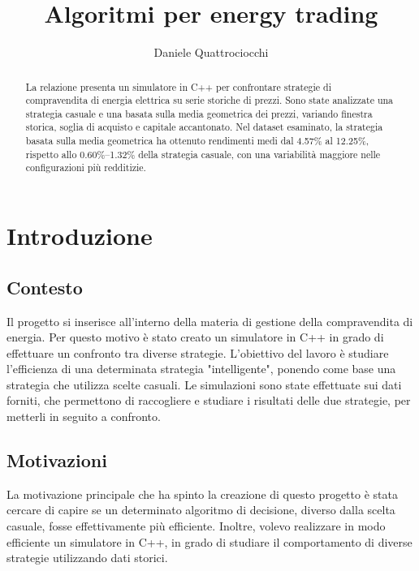 \documentclass[a4paper,oneside,italian]{sapthesis}
\title{Algoritmi per energy trading}
\author{Daniele Quattrociocchi}
\begin{document}
\frontmatter
\maketitle

\begin{abstract}
La relazione presenta un simulatore in C++ per confrontare strategie di compravendita
di energia elettrica su serie storiche di prezzi. Sono state analizzate una strategia
casuale e una basata sulla media geometrica dei prezzi, variando finestra storica,
soglia di acquisto e capitale accantonato. Nel dataset esaminato, la strategia basata
sulla media geometrica ha ottenuto rendimenti medi dal 4.57\% al 12.25\%, rispetto
allo 0.60\%--1.32\% della strategia casuale, con una variabilità maggiore nelle
configurazioni più redditizie.
\end{abstract}

\tableofcontents

\mainmatter


\chapter{Introduzione}


\section{Contesto}

Il progetto si inserisce all'interno della materia di gestione
della compravendita di energia.
Per questo motivo è stato creato un simulatore in C++ in grado
di effettuare un confronto tra diverse strategie.
L'obiettivo del lavoro è studiare l'efficienza di una determinata
strategia "intelligente", ponendo come base una strategia che utilizza
scelte casuali. Le simulazioni sono state effettuate sui dati forniti,
che permettono di raccogliere e studiare i risultati delle due strategie,
per metterli in seguito a confronto.



\section{Motivazioni}

La motivazione principale che ha spinto la creazione di questo progetto 
è stata cercare di capire se un determinato algoritmo di decisione, diverso
dalla scelta casuale, fosse effettivamente più efficiente.
Inoltre, volevo realizzare in modo efficiente un simulatore in C++,
in grado di studiare il comportamento di diverse strategie utilizzando dati storici.
\end{document}

